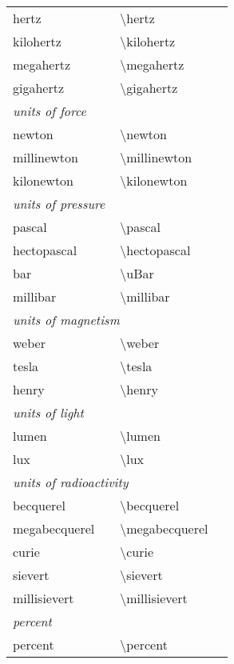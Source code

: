 \begin{longtable}{Xl>{\ttfamily\textbackslash}Xl}
     hertz            &\unitsignonly{\hertz}            &hertz&\\
     kilohertz        &\unitsignonly{\kilohertz}        &kilohertz&\cmd{\kHz}\\
     megahertz        &\unitsignonly{\megahertz}        &megahertz&\cmd{\MHz}\\
     gigahertz        &\unitsignonly{\gigahertz}        &gigahertz&\cmd{\GHz}\\[1ex]
     \multicolumn{4}{l}{\emph{units of force}}\\[.5ex]
     newton           &\unitsignonly{\newton}           &newton&\\
     millinewton      &\unitsignonly{\millinewton}      &millinewton&\\
     kilonewton       &\unitsignonly{\kilonewton}       &kilonewton&\\[1ex]
     \multicolumn{4}{l}{\emph{units of pressure}}\\[.5ex]
     pascal           &\unitsignonly{\pascal}           &pascal&\\
     hectopascal      &\unitsignonly{\hectopascal}      &hectopascal&\\
     bar              &\unitsignonly{\uBar}             &uBar&\\
     millibar         &\unitsignonly{\millibar}         &millibar&\\[1ex]
     \multicolumn{4}{l}{\emph{units of magnetism}}\\[.5ex]
     weber            &\unitsignonly{\weber}            &weber&\\
     tesla            &\unitsignonly{\tesla}            &tesla&\\
     henry            &\unitsignonly{\henry}            &henry&\\[1ex]
     \multicolumn{4}{l}{\emph{units of light}}\\[.5ex]
     lumen            &\unitsignonly{\lumen}            &lumen&\\
     lux              &\unitsignonly{\lux}              &lux&\\[1ex]
     \multicolumn{4}{l}{\emph{units of radioactivity}}\\[.5ex]
     becquerel        &\unitsignonly{\becquerel}        &becquerel&\\
     megabecquerel    &\unitsignonly{\megabecquerel}    &megabecquerel&\\
     curie            &\unitsignonly{\curie}            &curie&\\
     sievert          &\unitsignonly{\sievert}          &sievert&\\
     millisievert     &\unitsignonly{\millisievert}     &millisievert&\\
     \multicolumn{4}{l}{\emph{percent}}\\[.5ex]
     percent          &\unitsignonly{\percent}          &percent&
   \end{longtable}

